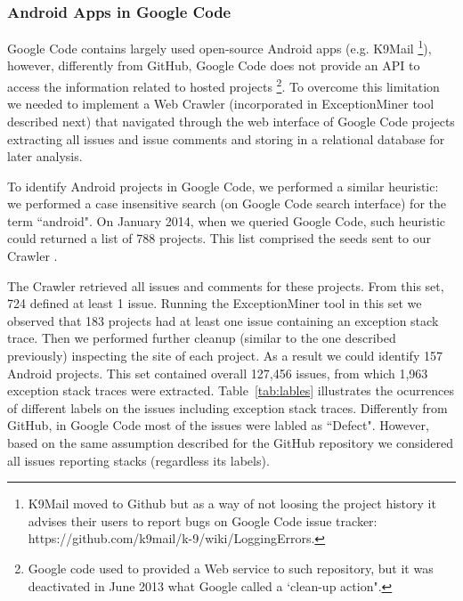 \documentclass[conference]{IEEEtran}
\begin{document}
\subsubsection{Android Apps in Google Code}
Google Code contains largely used open-source Android apps (e.g. K9Mail \footnote{K9Mail moved to Github but as a way of not loosing the project history 
it advises their users to report bugs on Google Code issue tracker: https://github.com/k9mail/k-9/wiki/LoggingErrors.}),
 however, differently from GitHub, Google Code does not provide an API to access the information related
 to hosted projects \footnote{Google code used to provided a Web service to such repository, but it was deactivated in June 2013 what Google called a `clean-up action".}.
To overcome this limitation we needed to implement a Web Crawler (incorporated in ExceptionMiner tool described next) that navigated 
through the web interface of Google Code projects extracting all issues and issue comments and storing in a relational database for later analysis.

To identify Android projects in Google Code, we performed a similar heuristic: we performed a case insensitive search 
(on Google Code search interface) for the term ``android". On January 2014, when we queried Google Code, such heuristic could
 returned a list of 788  projects. This list comprised the seeds sent to our Crawler .

The Crawler retrieved all issues and comments for these projects.
From this set, 724 defined at least 1 issue. Running the ExceptionMiner tool 
 in this set we observed that 183 projects had at least one issue containing an exception stack trace.
 Then we performed further cleanup (similar to the one described previously) inspecting the site 
of each project. As a result we could identify 157 Android projects.  This set contained overall 127,456 issues,
 from which 1,963 exception stack traces were extracted. Table~\ref{tab:lables} illustrates the ocurrences of different labels 
on the issues including exception stack traces. Differently from GitHub, in Google Code most of 
the issues were labled as ``Defect". However, based on the same assumption described for the GitHub repository
 we considered all issues reporting stacks (regardless its labels).


\end{document}
